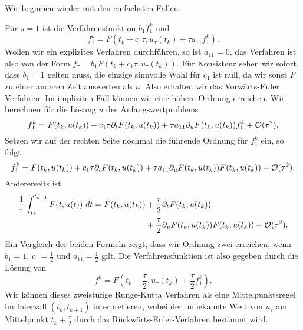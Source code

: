 Wir beginnen wieder mit den einfachsten Fällen.
%
\begin{example}{}{}
Für $s=1$ ist die Verfahrensfunktion $b_1 f_1^k$ und
$$ f_1^k = F(t_k + c_1 \tau, u_\tau(t_k) +  \tau a_{11} f_1^k). $$
Wollen wir ein explizites Verfahren durchführen, so ist $a_{11}=0$, das Verfahren ist also von der Form
$f_\tau = b_1 F(t_k+c_1 \tau,  u_\tau(t_k)). $
Für Konsistenz sehen wir sofort, dass $b_1=1$ gelten muss, die einzige sinnvolle Wahl für $c_1$ ist null, da wir sonst $F$ zu einer anderen Zeit auswerten als $u$. Also erhalten wir das Vorwärts-Euler Verfahren. Im impliziten Fall können wir eine höhere Ordnung erreichen. Wir berechnen für die Lösung $u$ des Anfangswertproblems
$$ f_1^k = F(t_k,u(t_k)) + c_1 \tau \partial_t F(t_k,u(t_k)) + \tau a_{11} \partial_u F(t_k,u(t_k)) f_1^k + {\cal O}(\tau^2). $$
Setzen wir auf der rechten Seite nochmal die führende Ordnung für $f_1^k$ ein, so folgt
$$ f_1^k = F(t_k,u(t_k)) + c_1 \tau \partial_t F(t_k,u(t_k)) + \tau a_{11}   \partial_u F(t_k,u(t_k)) F(t_k,u(t_k))+ {\cal O}(\tau^2). $$
Andererseits ist
%
\begin{align*}
\frac{1}\tau \int_{t_k}^{t_{k+1}} F(t,u(t)) ~dt = F(t_k,u(t_k)) &+ \frac{\tau}2 \partial_t F(t_k,u(t_k))\\ &+\frac{\tau}2 \partial_u F(t_k,u(t_k)) F(t_k,u(t_k)) + {\cal O}(\tau^2).
\end{align*}
Ein Vergleich der beiden Formeln zeigt, dass wir Ordnung zwei erreichen, wenn $b_1 =1$, $c_1=\frac{1}2$ und $a_{11}=\frac{1}2$ gilt. Die Verfahrensfunktion ist also gegeben durch die Lösung von
$$ f_1^k = F(t_k +\frac{\tau}2,u_\tau(t_k) + \frac{\tau}2 f_1^k). $$ 
Wir können dieses zweistufige Runge-Kutta Verfahren als eine Mittelpunktsregel im Intervall $(t_k,t_{k+1})$ interpretieren, wobei der unbekannte Wert von $u_\tau$ am Mittelpunkt $t_k +\frac{\tau}2$ durch das Rückwärts-Euler-Verfahren bestimmt wird.
\end{example} 

